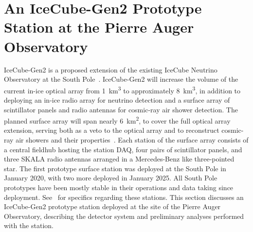 



\section{An IceCube-Gen2 Prototype Station at the Pierre Auger Observatory}\label{sec:gen2prototype}

IceCube-Gen2 is a proposed extension of the existing IceCube Neutrino Observatory at the South Pole~\cite{gen2tdr}.
IceCube-Gen2 will increase the volume of the current in-ice optical array from \qty{1}{\kilo\meter^{3}} to approximately \qty{8}{\kilo\meter^{3}}, in addition to deploying an in-ice radio array for neutrino detection and a surface array of scintillator panels and radio antennas for cosmic-ray air shower detection.
The planned surface array will span nearly \qty{6}{\kilo\meter^{2}}, to cover the full optical array extension, serving both as a veto to the optical array and to reconstruct cosmic-ray air showers and their properties~\cite{icrc2025_schroeder}.
Each station of the surface array consists of a central fieldhub hosting the station DAQ, four pairs of scintillator panels, and three SKALA radio antennas arranged in a Mercedes-Benz like three-pointed star.
The first prototype surface station was deployed at the South Pole in January 2020, with two more deployed in January 2025.
All South Pole prototypes have been mostly stable in their operations and data taking since deployment.
See~\cite{icrc2025_venugopal,icrc2025_koundal} for specifics regarding these stations.
This section discusses an IceCube-Gen2 prototype station deployed at the site of the Pierre Auger Observatory, describing the detector system and preliminary analyses performed with the station.

